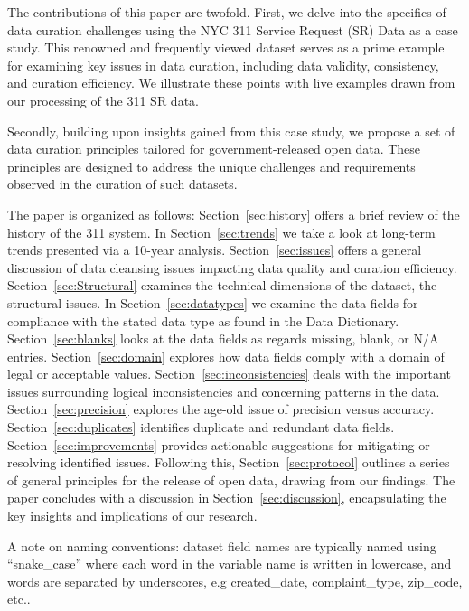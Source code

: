 \documentclass[12pt, titlepage]{article}
\begin{document}
The contributions of this paper are twofold. First, we delve into
the specifics of data curation challenges using the NYC 311 Service
Request (SR) Data as a case study. This renowned and frequently viewed 
dataset serves as a prime example for examining key issues in data curation, 
including data validity, consistency, and curation efficiency. 
We illustrate these points with live examples drawn from our processing of the 311 SR data. 

Secondly, building upon insights gained from this case study, we 
propose a set of data curation principles tailored for government-released open data. 
These principles are designed to address the unique challenges 
and requirements observed in the curation of such datasets.

The paper is organized as follows:
Section~\ref{sec:history} offers a brief review of the history of the 311 system. In 
Section~\ref{sec:trends} we take a look at long-term trends presented via a 10-year analysis.
Section~\ref{sec:issues} offers a general discussion of data cleansing issues
impacting data quality and curation efficiency. Section~\ref{sec:Structural} examines
the technical dimensions of the dataset, the structural issues. In Section~\ref{sec:datatypes} we examine the data fields
for compliance with the stated data type as found in the Data Dictionary. Section~\ref{sec:blanks} looks
at the data fields as regards missing, blank, or N/A entries. Section~\ref{sec:domain} explores
how data fields comply with a domain of legal or acceptable values. Section~\ref{sec:inconsistencies}
deals with the important issues surrounding logical inconsistencies and concerning patterns in the data. Section~\ref{sec:precision} 
explores the age-old issue of precision versus accuracy. Section~\ref{sec:duplicates}
identifies duplicate and redundant data fields. Section~\ref{sec:improvements} provides 
actionable suggestions for mitigating or resolving identified issues. Following this, Section~\ref{sec:protocol} outlines a series of general 
principles for the release of open data, drawing from our findings. The paper concludes with a discussion 
in Section~\ref{sec:discussion}, encapsulating the key insights and implications of our research.

A note on naming conventions: dataset field names are typically named using ``snake\_case'' where
each word in the variable name is written in lowercase, and words are separated by underscores,
e.g created\_date, complaint\_type, zip\_code, etc..   
\end{document}
